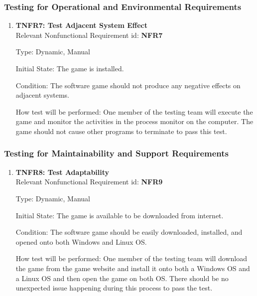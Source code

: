 \documentclass[12pt, titlepage]{article}
\begin{document}
\subsubsection{Testing for Operational and Environmental Requirements}
\begin{enumerate}
\item{\textbf{TNFR7: Test Adjacent System Effect\\}}
Relevant Nonfunctional Requirement id: \textbf{NFR7}

Type: Dynamic, Manual

Initial State: The game is installed.

Condition: The software game should not produce any negative effects on adjacent systems.

How test will be performed: One member of the testing team will execute the game and monitor the activities in the process monitor on the computer. The game should not cause other programs to terminate to pass this test.



\end{enumerate}


\subsubsection{Testing for Maintainability and Support Requirements}
\begin{enumerate}
\item{\textbf{TNFR8: Test Adaptability\\}}
Relevant Nonfunctional Requirement id: \textbf{NFR9}

Type: Dynamic, Manual

Initial State: The game is available to be downloaded from internet.

Condition: The software game should be easily downloaded, installed, and opened onto both Windows and Linux OS.

How test will be performed: One member of the testing team will download the game from the game website and install it onto both a Windows OS and a Linux OS and then open the game on both OS. There should be no unexpected issue happening during this process to pass the test.



\end{enumerate}
\end{document}
